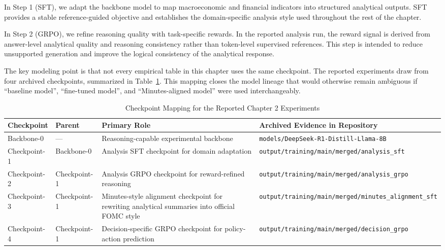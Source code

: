 In Step 1 (SFT), we adapt the backbone model to map macroeconomic and financial indicators into structured analytical outputs. SFT provides a stable reference-guided objective and establishes the domain-specific analysis style used throughout the rest of the chapter.

In Step 2 (GRPO), we refine reasoning quality with task-specific rewards. In the reported analysis run, the reward signal is derived from answer-level analytical quality and reasoning consistency rather than token-level supervised references. This step is intended to reduce unsupported generation and improve the logical consistency of the analytical response.

The key modeling point is that not every empirical table in this chapter uses the same checkpoint. The reported experiments draw from four archived checkpoints, summarized in Table~\ref{tab:ch2:checkpoint_map}. This mapping closes the model lineage that would otherwise remain ambiguous if ``baseline model'', ``fine-tuned model'', and ``Minutes-aligned model'' were used interchangeably.

\begin{table}[htbp]
    \centering
    \footnotesize
    \begin{tabular}{p{} p{} p{} p{}}
        \toprule
        \textbf{Checkpoint} & \textbf{Parent} & \textbf{Primary Role} & \textbf{Archived Evidence in Repository} \\
        \midrule
        Backbone-0 & --- & Reasoning-capable experimental backbone & \texttt{models/DeepSeek-R1-Distill-Llama-8B} \\
        Checkpoint-1 & Backbone-0 & Analysis SFT checkpoint for domain adaptation & \texttt{output/training/main/merged/analysis\_sft} \\
        Checkpoint-2 & Checkpoint-1 & Analysis GRPO checkpoint for reward-refined reasoning & \texttt{output/training/main/merged/analysis\_grpo} \\
        Checkpoint-3 & Checkpoint-1 & Minutes-style alignment checkpoint for rewriting analytical summaries into official FOMC style & \texttt{output/training/main/merged/minutes\_alignment\_sft} \\
        Checkpoint-4 & Checkpoint-1 & Decision-specific GRPO checkpoint for policy-action prediction & \texttt{output/training/main/merged/decision\_grpo} \\
        \bottomrule
    \end{tabular}
    \caption{Checkpoint Mapping for the Reported Chapter 2 Experiments}
    \label{tab:ch2:checkpoint_map}
\end{table}

